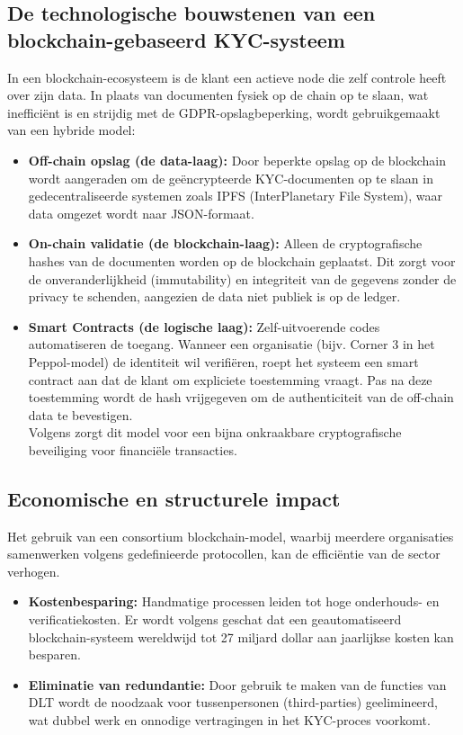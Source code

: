 \subsection{De technologische bouwstenen van een blockchain-gebaseerd KYC-systeem \autocite{Malhotra2022}}
In een blockchain-ecosysteem is de klant een actieve node die zelf controle heeft over zijn data. 
In plaats van documenten fysiek op de chain op te slaan, wat inefficiënt is en strijdig met de GDPR-opslagbeperking, wordt gebruikgemaakt van een hybride model:
\begin{itemize}
    \item \textbf{Off-chain opslag (de data-laag):} Door beperkte opslag op de blockchain wordt aangeraden om de geëncrypteerde KYC-documenten op te slaan in gedecentraliseerde systemen zoals IPFS (InterPlanetary File System), waar data omgezet wordt naar JSON-formaat.
    \item \textbf{On-chain validatie (de blockchain-laag):} Alleen de cryptografische hashes van de documenten worden op de blockchain geplaatst. Dit zorgt voor de onveranderlijkheid (immutability) en integriteit van de gegevens zonder de privacy te schenden, aangezien de data niet publiek is op de ledger.
    \item \textbf{Smart Contracts (de logische laag):} Zelf-uitvoerende codes automatiseren de toegang. Wanneer een organisatie (bijv. Corner 3 in het Peppol-model) de identiteit wil verifiëren, roept het systeem een smart contract aan dat de klant om expliciete toestemming vraagt. Pas na deze toestemming wordt de hash vrijgegeven om de authenticiteit van de off-chain data te bevestigen.
    \\ Volgens \autocite{Yadav2020} zorgt dit model voor een bijna onkraakbare cryptografische beveiliging voor financiële transacties.
\end{itemize}

\subsection{Economische en structurele impact}
Het gebruik van een consortium blockchain-model, waarbij meerdere organisaties samenwerken volgens gedefinieerde protocollen, kan de efficiëntie van de sector verhogen.
\begin{itemize}
\item \textbf{Kostenbesparing:} Handmatige processen leiden tot hoge onderhouds- en verificatiekosten. Er wordt volgens \autocite{Yadav2020} geschat dat een geautomatiseerd blockchain-systeem wereldwijd tot 27 miljard dollar aan jaarlijkse kosten kan besparen.
\item \textbf{Eliminatie van redundantie:} Door gebruik te maken van de functies van DLT wordt de noodzaak voor tussenpersonen (third-parties) geelimineerd, wat dubbel werk en onnodige vertragingen in het KYC-proces voorkomt.
\end{itemize}

